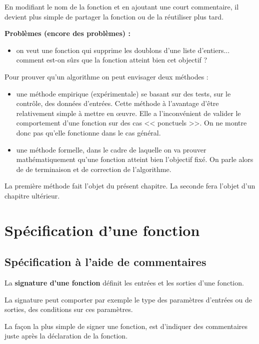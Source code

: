 En modifiant le nom de la fonction et en ajoutant une court commentaire, il devient plus simple de partager la fonction ou de la réutiliser plus tard. 

\textbf{Problèmes (encore des problèmes) :}
\begin{itemize}
\item on veut une fonction qui supprime les doublons d'une liste d'entiers... comment est-on sûrs que la fonction atteint bien cet objectif ?
\end{itemize}
 
Pour prouver qu'un algorithme on peut envisager deux méthodes : 
\begin{itemize}
\item une méthode empirique (expérimentale) se basant sur des tests, sur le contrôle, des données d'entrées. Cette méthode à l'avantage d'être relativement simple à mettre en \oe{}uvre. Elle a l'inconvénient de valider le comportement d'une fonction sur des cas << ponctuels >>. On ne montre donc pas qu'elle fonctionne dans le cas général. 
\item une méthode formelle, dans le cadre de laquelle on va prouver mathématiquement qu'une fonction atteint bien l'objectif fixé. On parle alors de de terminaison et de correction de l'algorithme.
\end{itemize}

La première méthode fait l'objet du présent chapitre. La seconde fera l'objet d'un chapitre ultérieur. 




\section{Spécification d'une fonction}

\subsection{Spécification à l'aide de commentaires}
\begin{defi}[Signature]
La \textbf{signature d'une fonction} définit les entrées et les sorties d'une fonction. 
\end{defi}

La signature peut comporter par exemple le type  des paramètres d'entrées ou de sorties, des conditions sur ces paramètres. 

La façon la plus simple de signer une fonction, est d'indiquer des commentaires juste après la déclaration de la fonction. 

